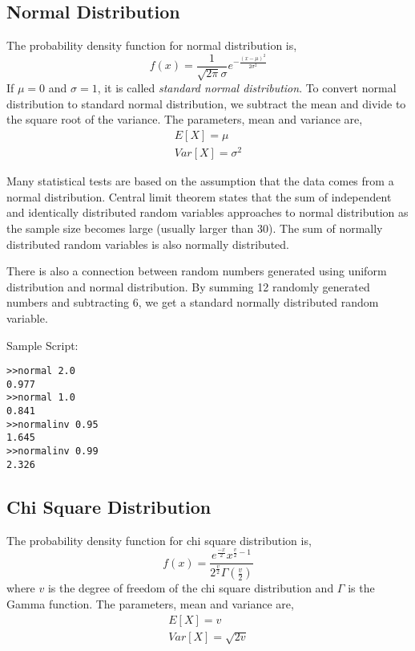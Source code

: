 \documentclass[a4paper,12pt]{book}
\begin{document}
\subsection{Normal Distribution}

The probability density function for normal distribution is,
\begin{equation}
f(x)=\frac{1}{\sqrt{2\pi}\sigma}e^{-\frac{(x-\mu)^2}{2\sigma^2}}
\end{equation}
If $\mu=0$ and $\sigma=1$, it is called {\em standard normal distribution}. To convert normal distribution to standard normal distribution, we subtract the mean and divide to the square root of the variance. The parameters, mean and variance are,
\begin{eqnarray}
E[X]=\mu \nonumber \\
Var[X]=\sigma^2
\end{eqnarray}

Many statistical tests are based on the assumption that the data comes from a normal distribution. Central limit theorem states that the sum of independent and identically distributed random variables approaches to normal distribution as the sample size becomes large (usually larger than 30). The sum of normally distributed random variables is also normally distributed.

There is also a connection between random numbers generated using uniform distribution and normal distribution. By summing 12 randomly generated numbers and subtracting 6, we get a standard normally distributed random variable.

Sample Script:
\begin{verbatim}
>>normal 2.0
0.977
>>normal 1.0
0.841
>>normalinv 0.95
1.645
>>normalinv 0.99
2.326
\end{verbatim}

\subsection{Chi Square Distribution}
The probability density function for chi square distribution is,
\begin{equation}
f(x)=\frac{e^\frac{-x}{2}x^{{\frac{v}{2}}-1}}{2^\frac{v}{2}\Gamma(\frac{v}{2})}
\end{equation}
where $v$ is the degree of freedom of the chi square distribution and $\Gamma$ is the Gamma function. The parameters, mean and variance are,
\begin{eqnarray}
E[X]=v \nonumber \\
Var[X]=\sqrt{2v}
\end{eqnarray}
\end{document}
